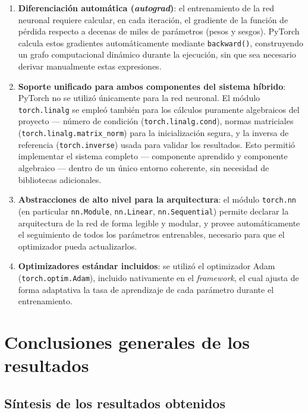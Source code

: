 \documentclass[12pt,a4paper]{article}
\begin{document}
\begin{enumerate}
    \item \textbf{Diferenciación automática (\textit{autograd})}: el entrenamiento de la red neuronal requiere calcular, en cada iteración, el gradiente de la función de pérdida respecto a decenas de miles de parámetros (pesos y sesgos). PyTorch calcula estos gradientes automáticamente mediante \texttt{backward()}, construyendo un grafo computacional dinámico durante la ejecución, sin que sea necesario derivar manualmente estas expresiones.

    \item \textbf{Soporte unificado para ambos componentes del sistema híbrido}: PyTorch no se utilizó únicamente para la red neuronal. El módulo \texttt{torch.linalg} se empleó también para los cálculos puramente algebraicos del proyecto --- número de condición (\texttt{torch.linalg.cond}), normas matriciales (\texttt{torch.linalg.matrix\_norm}) para la inicialización segura, y la inversa de referencia (\texttt{torch.inverse}) usada para validar los resultados. Esto permitió implementar el sistema completo --- componente aprendido y componente algebraico --- dentro de un único entorno coherente, sin necesidad de bibliotecas adicionales.

    \item \textbf{Abstracciones de alto nivel para la arquitectura}: el módulo \texttt{torch.nn} (en particular \texttt{nn.Module}, \texttt{nn.Linear}, \texttt{nn.Sequential}) permite declarar la arquitectura de la red de forma legible y modular, y provee automáticamente el seguimiento de todos los parámetros entrenables, necesario para que el optimizador pueda actualizarlos.

    \item \textbf{Optimizadores estándar incluidos}: se utilizó el optimizador Adam (\texttt{torch.optim.Adam}), incluido nativamente en el \textit{framework}, el cual ajusta de forma adaptativa la tasa de aprendizaje de cada parámetro durante el entrenamiento.
\end{enumerate}

\section{Conclusiones generales de los resultados}

\subsection{Síntesis de los resultados obtenidos}
\end{document}
